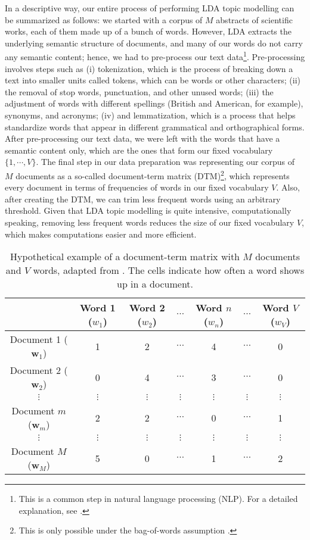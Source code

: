 In a descriptive way, our entire process of performing LDA topic modelling can be summarized as follows: we started with a corpus of $M$ abstracts of scientific works, each of them made up of a bunch of words. However, LDA extracts the underlying semantic structure of documents, and many of our words do not carry any semantic content; hence, we had to pre-process our text data\footnote{This is a common step in natural language processing (NLP). For a detailed explanation, see \cite[p. 9-12]{ponweiser_latent_2012}.}. Pre-processing involves steps such as (i) tokenization, which is the process of breaking down a text into smaller units called tokens, which can be words or other characters; (ii) the removal of stop words, punctuation, and other unused words; (iii) the adjustment of words with different spellings (British and American, for example), synonyms, and acronyms; (iv) and lemmatization, which is a process that helps standardize words that appear in different grammatical and orthographical forms. After pre-processing our text data, we were left with the words that have a semantic content only, which are the ones that form our fixed vocabulary $\{1, \cdots, V \}$. The final step in our data preparation was representing our corpus of $M$ documents as a so-called document-term matrix (DTM)\footnote{This is only possible under the bag-of-words assumption \citep{ponweiser_latent_2012}.}, which represents every document in terms of frequencies of words in our fixed vocabulary $V$. Also, after creating the DTM, we can trim less frequent words using an arbitrary threshold. Given that LDA topic modelling is quite intensive, computationally speaking, removing less frequent words reduces the size of our fixed vocabulary $V$, which makes computations easier and more efficient.

\begin{table}[]
	\centering
	\begin{tabular}{c|cccccc}
           		        & Word 1 ($w_{1}$) & Word 2 ($w_{2}$) & $\cdots$ & Word $n$ ($w_{n}$) & $\cdots$ & Word $V$ ($w_{V}$) \\ \hline
Document 1 ($\mathbf{w}_{1}$) & 1 & 2 & $\cdots$ & 4 & $\cdots$ & 0 \\
Document 2 ($\mathbf{w}_{2}$) & 0 & 4 & $\cdots$ & 3 & $\cdots$ & 0 \\
$\vdots$ & $\vdots$ & $\vdots$ & $\vdots$ & $\vdots$ & $\vdots$ & $\vdots$ \\
Document $m$ ($\mathbf{w}_{m}$) & 2 & 2 & $\cdots$ & 0 & $\cdots$ & 1 \\
$\vdots$ & $\vdots$ & $\vdots$ & $\vdots$ & $\vdots$ & $\vdots$ & $\vdots$ \\
Document $M$ ($\mathbf{w}_{M}$) & 5 & 0 & $\cdots$ & 1 & $\cdots$ & 2
	\end{tabular}
	\caption{Hypothetical example of a document-term matrix with $M$ documents and $V$ words, adapted from \cite{ponweiser_latent_2012}. The cells indicate how often a word shows up in a document.}
	\label{tab:dtm}
\end{table}

